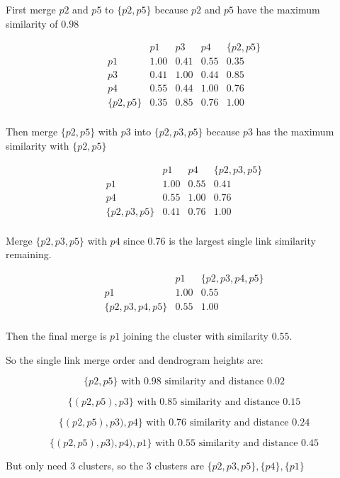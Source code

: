 \documentclass[11pt]{article}
\begin{document}
First merge $p2$ and $p5$ to $\{p2, p5\}$ because $p2$ and $p5$ have the maximum similarity of $0.98$

\[
\begin{array}{c|cccc}
 & p1 & p3 & p4 & \{p2,p5\} \\
\hline
p1 & 1.00 & 0.41 & 0.55 & 0.35 \\
p3 & 0.41 & 1.00 & 0.44 & 0.85 \\
p4 & 0.55 & 0.44 & 1.00 & 0.76 \\
\{p2,p5\} & 0.35 & 0.85 & 0.76 & 1.00 \\
\end{array}
\]

Then merge $\{p2, p5\}$ with $p3$ into $\{p2, p3, p5\}$ because $p3$ has the maximum similarity with $\{p2, p5\}$

\[
\begin{array}{c|ccc}
 & p1 & p4 & \{p2,p3,p5\} \\
\hline
p1 & 1.00 & 0.55 & 0.41 \\
p4 & 0.55 & 1.00 & 0.76 \\
\{p2,p3,p5\} & 0.41 & 0.76 & 1.00 \\
\end{array}
\]

Merge $\{p2,p3,p5\}$ with $p4$ since $0.76$ is the largest single link similarity remaining.

\[
\begin{array}{c|cc}
 & p1 & \{p2,p3,p4,p5\} \\
\hline
p1 & 1.00 & 0.55 \\
\{p2,p3,p4,p5\} & 0.55 & 1.00 \\
\end{array}
\]

Then the final merge is $p1$ joining the cluster with similarity $0.55$.

So the single link merge order and dendrogram heights are:

\[
\{p2, p5\} \text{ with } 0.98 \text{ similarity and distance } 0.02
\]

\[
\{(p2,p5),p3\} \text{ with } 0.85 \text{ similarity and distance } 0.15
\]

\[
\{(p2,p5),p3),p4\} \text{ with } 0.76 \text{ similarity and distance } 0.24
\]

\[
\{(p2,p5),p3),p4),p1\} \text{ with } 0.55 \text{ similarity and distance } 0.45
\]

But only need 3 clusters, so the 3 clusters are $\{p2,p3,p5\}, \{p4\}, \{p1\}$
\end{document}
